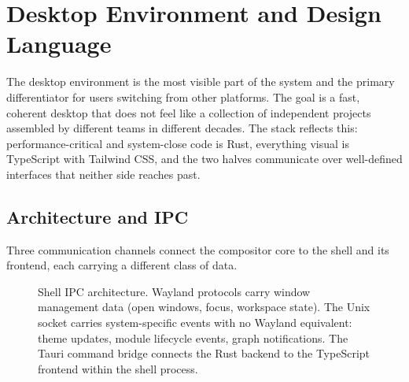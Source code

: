 \section{Desktop Environment and Design Language}
\label{sec:desktop}

The desktop environment is the most visible part of the system and the primary
differentiator for users switching from other platforms. The goal is a fast,
coherent desktop that does not feel like a collection of independent projects
assembled by different teams in different decades. The stack reflects this:
performance-critical and system-close code is Rust, everything visual is
TypeScript with Tailwind CSS, and the two halves communicate over well-defined
interfaces that neither side reaches past.

\subsection{Architecture and IPC}
\label{sec:desktop-ipc}

Three communication channels connect the compositor core to the shell and its
frontend, each carrying a different class of data.

\begin{figure}[htbp]
\centering
{}
\caption{Shell IPC architecture. Wayland protocols carry window management data
(open windows, focus, workspace state). The Unix socket carries system-specific
events with no Wayland equivalent: theme updates, module lifecycle events,
graph notifications. The Tauri command bridge connects the Rust backend to the
TypeScript frontend within the shell process.}
\label{fig:shell-ipc}
\end{figure}

